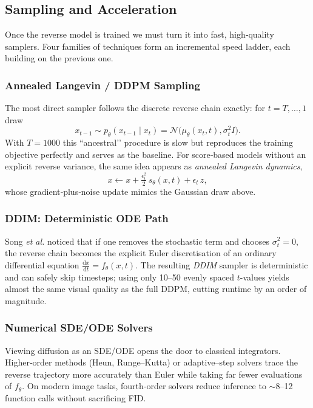 \documentclass{article}
\begin{document}
\subsection{Sampling and Acceleration}
Once the reverse model is trained we must turn it into fast, high‑quality samplers. Four families of techniques form an incremental speed ladder, each building on the previous one.

\subsubsection{Annealed Langevin / DDPM Sampling}
The most direct sampler follows the discrete reverse chain exactly: for \(t=T,\dots,1\) draw
\[
  x_{t-1}\sim p_\theta(x_{t-1}\mid x_t)
  = \mathcal{N}\bigl(\mu_\theta(x_t,t),\sigma_t^{2}I\bigr).
\]
With \(T\!=\!1000\) this “ancestral’’ procedure is slow but reproduces the training objective perfectly and serves as the baseline.  For score‑based models without an explicit reverse variance, the same idea appears as \emph{annealed Langevin dynamics},
\[
  x \leftarrow x + \tfrac{\epsilon_t^2}{2}\,s_\theta(x,t) + \epsilon_t\,z,
\]
whose gradient‑plus‑noise update mimics the Gaussian draw above.

\subsubsection{DDIM: Deterministic ODE Path}
Song \emph{et al.} noticed that if one removes the stochastic term and chooses
\(
  \sigma_t^2=0,
\)
the reverse chain becomes the explicit Euler discretisation of an ordinary differential equation
\(
  \frac{\mathrm{d}x}{\mathrm{d}t}=f_\theta(x,t).
\)
The resulting \emph{DDIM} sampler is deterministic and can safely skip timesteps; using only 10–50 evenly spaced \(t\)-values yields almost the same visual quality as the full DDPM, cutting runtime by an order of magnitude.

\subsubsection{Numerical SDE/ODE Solvers}
Viewing diffusion as an SDE/ODE opens the door to classical integrators.  Higher‑order methods (Heun, Runge–Kutta) or adaptive–step solvers trace the reverse trajectory more accurately than Euler while taking far fewer evaluations of \(f_\theta\).  On modern image tasks, fourth‑order solvers reduce inference to \(\sim\!8\)–12 function calls without sacrificing FID.
\end{document}
